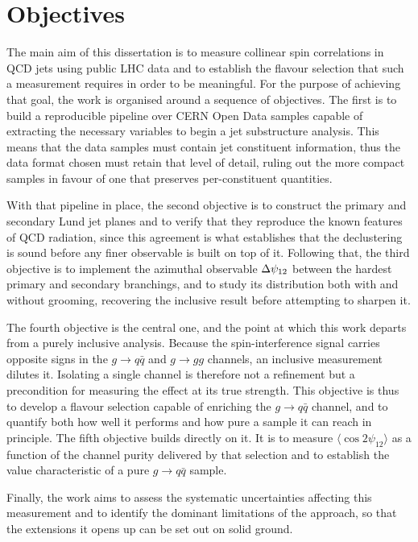 \section{Objectives}
\label{sec:objetivos}

The main aim of this dissertation is to measure collinear spin correlations in QCD
jets using public LHC data and to establish the flavour selection that such a
measurement requires in order to be meaningful. For the purpose of achieving that goal,
the work is organised around a sequence of objectives. The first is to build a reproducible 
pipeline over CERN Open Data samples capable
of extracting the necessary variables to begin a jet substructure analysis. This means
that the data samples must contain jet constituent information, thus the data format
chosen must retain that level of detail, ruling out the more compact samples in favour
of one that preserves per-constituent quantities.

With that pipeline in place, the second objective is to construct the primary
and secondary Lund jet planes and to verify that they reproduce the known
features of QCD radiation, since this agreement is what establishes that the
declustering is sound before any finer observable is built on top of it. 
Following that, the third objective is to implement the azimuthal observable $\Delta\psi_{12}$
between the hardest primary and secondary branchings, and to study its
distribution both with and without grooming, recovering the inclusive result
before attempting to sharpen it.

The fourth objective is the central one, and the point at which this work departs
from a purely inclusive analysis. Because the spin-interference signal carries
opposite signs in the $g \to q\bar{q}$ and $g \to gg$ channels, an inclusive
measurement dilutes it. Isolating a single channel is therefore not a refinement
but a precondition for measuring the effect at its true strength. This objective
is thus to develop a flavour selection capable of enriching the $g \to q\bar{q}$
channel, and to quantify both how well it performs and how pure a sample it can
reach in principle. The fifth objective builds directly on it. It is to measure
$\langle \cos 2\psi_{12} \rangle$ as a function of the channel purity delivered
by that selection and to establish the value characteristic
of a pure $g \to q\bar{q}$ sample. 

Finally, the work aims to assess the systematic
uncertainties affecting this measurement and to identify the dominant limitations
of the approach, so that the extensions it opens up can be set out on solid ground.

